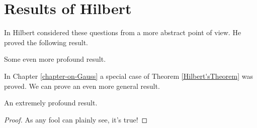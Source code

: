 
\chapter{Results of Hilbert}


\label{chapter-on-Hilbert}

In \cite{Hilbert1893} Hilbert considered these questions from a more
abstract point of view. He proved the following result.
\begin{thm}
\cite{Hilbert1893} \label{Hilbert'sTheorem} Some even more profound
result. 
\end{thm}
In Chapter \ref{chapter-on-Gauss} a special case of Theorem \ref{Hilbert'sTheorem}
was proved. We can prove an even more general result.
\begin{thm}
\label{mytheorem} An extremely profound result. \end{thm}
\begin{proof}
As any fool can plainly see, it's true! \end{proof}

